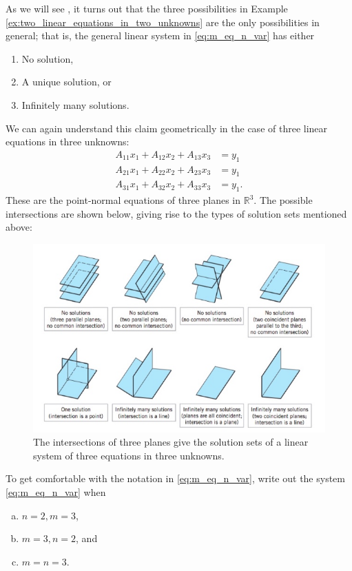 \documentclass[12pt,letterpaper,reqno]{article}
\numberwithin{equation}{section}
\newcommand{\R}{\ensuremath{\mathbb R}}
\newcommand{\fixme}[1]{{\color{orange}{[#1]}}}
\begin{document}
As we will see \fixme{Insert link to proof.}, it turns out that the three possibilities in Example \ref{ex:two_linear_equations_in_two_unknowns} are the only possibilities in general; that is, the general linear system in \eqref{eq:m_eq_n_var} has either 
\begin{enumerate}
	\item No solution,
	\item A unique solution, or
	\item Infinitely many solutions.
\end{enumerate}
We can again understand this claim geometrically in the case of three linear equations in three unknowns:
\begin{align*}
	A_{11}x_1+A_{12}x_2+A_{13}x_3&=y_1 \\
	A_{21}x_1+A_{22}x_2+A_{23}x_3&=y_1 \\
	A_{31}x_1+A_{32}x_2+A_{33}x_3&=y_1.
\end{align*}
These are the point-normal equations of three planes in $\R^3$. The possible intersections are shown below, giving rise to the types of solution sets mentioned above:
\begin{figure}[h]
	\begin{center}
		\includegraphics[scale=0.5]{figures_mvc/plane_intersections_anton_fig}
	\end{center}
	\caption{The intersections of three planes give the solution sets of a linear system of three equations in three unknowns.}
\end{figure}
\newpage 
\begin{exercise}
To get comfortable with the notation in \eqref{eq:m_eq_n_var}, write out the system \eqref{eq:m_eq_n_var} when 
\begin{enumerate}[(a)]
	\item $n=2,m=3$, 
	\item $m=3,n=2$, and 
	\item $m=n=3$. 
\end{enumerate}	
\end{exercise}
\end{document}
